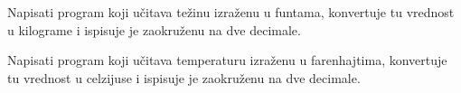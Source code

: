 \begin{Exercise}[label=p1.1_10b] 
Napisati program koji učitava težinu izraženu
   u funtama, konvertuje tu vrednost u kilograme i ispisuje je zaokruženu na dve decimale. 
\end{Exercise}

\begin{Exercise}[label=p1.1_10c] 
Napisati program koji učitava temperaturu izraženu
   u farenhajtima, konvertuje tu vrednost u celzijuse i ispisuje je zaokruženu na dve decimale. 
\end{Exercise}

\begin{comment}
\begin{Exercise}[label=p1.1_10] 
\komentarM{Razbiti ovaj zadatak na tri zadatka i staviti da idu zajedno uz zadatak sa incima. *ODGOVOR: zadatak je razbijen* }
Napisati program koji:
\begin{itemize}
\item unetu dužinu u miljama konvertuje u kilometre (1 mi = 1.609344 km)
\item unetu težinu u funtama konvertuje u kilograme ( 1 lb = 0.45359237 kg)
\item unetu temperaturu u celzijusima konvertuje u farenhajte ($F=\frac{9\cdot C}{5}+32$)
\end{itemize}


\begin{maxitest}
\begin{upotreba}{1}
#\naslovInt#
#\izlaz{Unesite duzinu u miljama:}\ulaz{1.8}#
#\izlaz{Vrednost duzine u kilometrima je: 2.896819}#
#\izlaz{Unesite tezinu u funtama:}\ulaz{10}#
#\izlaz{Vrednost tezine u kilogramima je: 4.535923}#
#\izlaz{Unesite temperaturu u celzjusima:}\ulaz{37.2}#
#\izlaz{Vrednost temperature u farenhajtima je: 98.960007}#
\end{upotreba}
\end{maxitest}
\linkresenje{p1.1_10}
\end{Exercise}
\begin{Answer}[ref=p1.1_10]
\includecode{resenja/1_KontrolaToka/1.1_UvodniZadaci/praktikumi4/1_10.c}
\end{Answer}
\end{comment}


